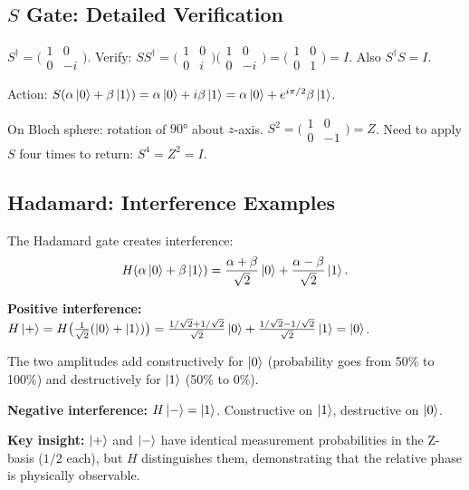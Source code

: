 \documentclass[10pt,a4paper]{article}
\begin{document}
\subsection{$S$ Gate: Detailed Verification}

$S^\dagger=\bigl(\begin{smallmatrix}1&0\\0&-i\end{smallmatrix}\bigr)$. Verify: $SS^\dagger=\bigl(\begin{smallmatrix}1&0\\0&i\end{smallmatrix}\bigr)\bigl(\begin{smallmatrix}1&0\\0&-i\end{smallmatrix}\bigr)=\bigl(\begin{smallmatrix}1&0\\0&1\end{smallmatrix}\bigr)=I$. Also $S^\dagger S=I$.

Action: $S(\alpha\ket{0}+\beta\ket{1})=\alpha\ket{0}+i\beta\ket{1}=\alpha\ket{0}+e^{i\pi/2}\beta\ket{1}$.

On Bloch sphere: rotation of $90°$ about $z$-axis. $S^2=\bigl(\begin{smallmatrix}1&0\\0&-1\end{smallmatrix}\bigr)=Z$. Need to apply $S$ four times to return: $S^4=Z^2=I$.

\subsection{Hadamard: Interference Examples}

The Hadamard gate creates interference:
\[
H(\alpha\ket{0}+\beta\ket{1})=\frac{\alpha+\beta}{\sqrt{2}}\ket{0}+\frac{\alpha-\beta}{\sqrt{2}}\ket{1}.
\]

\textbf{Positive interference:} $H\ket{+}=H\bigl(\frac{1}{\sqrt{2}}(\ket{0}+\ket{1})\bigr)=\frac{1/\sqrt{2}+1/\sqrt{2}}{\sqrt{2}}\ket{0}+\frac{1/\sqrt{2}-1/\sqrt{2}}{\sqrt{2}}\ket{1}=\ket{0}$.

The two amplitudes add constructively for $\ket{0}$ (probability goes from 50\% to 100\%) and destructively for $\ket{1}$ (50\% to 0\%).

\textbf{Negative interference:} $H\ket{-}=\ket{1}$. Constructive on $\ket{1}$, destructive on $\ket{0}$.

\textbf{Key insight:} $\ket{+}$ and $\ket{-}$ have identical measurement probabilities in the Z-basis ($1/2$ each), but $H$ distinguishes them, demonstrating that the relative phase is physically observable.
\end{document}
